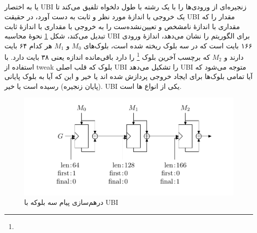 \subsection{}
یا به اختصار 
UBI
زنجیره‌ای از ورودی‌ها را با یک رشته با طول دلخواه تلفیق می‌کند تا یک خروجی با اندازهٔ مورد نظر و ثابت به دست آورد، در حقیقت 
UBI
مقدار 
را که مقداری با اندازهٔ نامشخص و تعیین‌نشده‌ست را به خروجی با مقداری با اندازهٔ ثابت تبدیل می‌کند، شکل 
\ref{three_block_message}
نحوهٔ محاسبه 
UBI
برای الگوریتم 
را نشان می‌دهد، اندازهٔ ورودی ۱۶۶ بایت است که در سه بلوک ریخته شده است، بلوک‌های 
$M_0$
و 
$M_1$
هر کدام ۶۴ بایت دارند و 
$M_2$ 
که برچسب آخرین بلوک
\footnote{}
را دارد باقی‌مانده اندازه یعنی ۳۸ بایت دارد. با استفاده از 
tweak
بلوک که قلب اصلی 
UBI
را تشکیل می‌دهد
UBI 
متوجه می‌شود که آیا تمامی بلوک‌ها برای ایجاد خروجی پردازش شده اند یا خیر و این که آیا به بلوک پایانی (پایان زنجیره) رسیده است یا خیر. 
UBI 
یکی از انواع 
ها است.
\cite{matyas}
\begin{figure}
	\centering
	\includegraphics[width=\textwidth]{figs/three_block_message.png}
	\caption{درهم‌سازی پیام سه بلوکه  با UBI}
	\label{three_block_message}
\end{figure}

